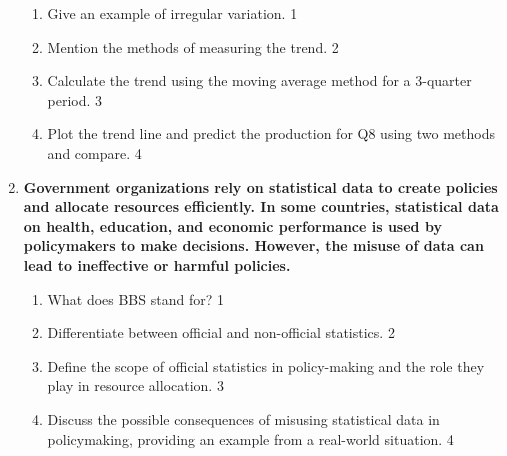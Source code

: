 \documentclass{article}
\begin{document}
\begin{enumerate}
    \begin{enumerate}
     \item Give an example of irregular variation. \hfill 1
     \item Mention the methods of measuring the trend. \hfill 2
\item
Calculate the trend using the moving average method for a 3-quarter 
period. \hfill 3
\item
Plot the trend line and predict the production for Q8 using two methods 
and compare. \hfill 4
\end{enumerate}

\item
\textbf{Government organizations rely on statistical data to create policies 
and allocate resources efficiently. In some countries, statistical data on 
health, education, and economic performance is used by policymakers to make 
decisions. However, the misuse of data can lead to ineffective or 
harmful policies.}

\begin{enumerate}
    \item What does BBS stand for? \hfill 1
    \item Differentiate between official and non-official statistics. \hfill 2
    \item  
    Define the scope of official statistics in policy-making and the role 
    they play in resource allocation. \hfill 3
    \item
    Discuss the possible consequences of misusing statistical data in 
    policymaking, providing an example from a real-world situation. \hfill 4
\end{enumerate}
  
\end{enumerate}
\end{document}
